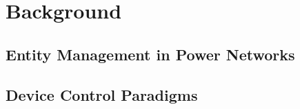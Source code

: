 \section{Background}
\label{ch-review:sec:background}

\subsection{Entity Management in Power Networks}

\subsection{Device Control Paradigms}

%
